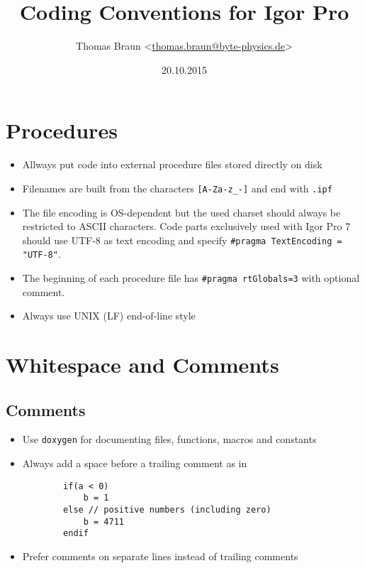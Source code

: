 \documentclass{scrartcl}
\date{20.10.2015}
\author{Thomas Braun <\url{thomas.braun@byte-physics.de}>}
\title{Coding Conventions for Igor Pro}
\begin{document}
%
\maketitle
%
\section{Procedures}
%
\begin{itemize}
	\item Allways put code into external procedure files stored directly on disk
%	
	\item Filenames are built from the characters \texttt{[A-Za-z_-]} and end with \texttt{.ipf}
%	
	\item The file encoding is OS-dependent but the used charset should always be restricted to ASCII characters.
		  Code parts exclusively used with Igor Pro 7 should use UTF-8 as text encoding and specify \texttt{#pragma TextEncoding = "UTF-8"}.
%
	\item The beginning of each procedure file has \texttt{#pragma rtGlobals=3} with optional comment.
%	
	\item Always use UNIX (LF) end-of-line style
\end{itemize}
%
\section{Whitespace and Comments}
%
\subsection*{Comments}
%
\begin{itemize}
	\item Use \texttt{doxygen} for documenting files, functions, macros and constants
%	
	\item Always add a space before a trailing comment as in
	\begin{verbatim}
		if(a < 0)
			b = 1
		else // positive numbers (including zero)
			b = 4711
		endif
	\end{verbatim}
%	
	\item Prefer comments on separate lines instead of trailing comments
%	
\end{itemize}
%	
\end{document}
